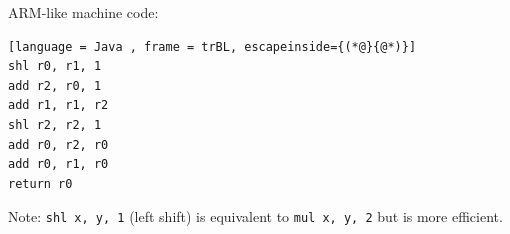 ARM-like machine code:
\begin{lstlisting}[language = Java , frame = trBL, escapeinside={(*@}{@*)}]
shl r0, r1, 1
add r2, r0, 1
add r1, r1, r2
shl r2, r2, 1 
add r0, r2, r0
add r0, r1, r0
return r0
\end{lstlisting}

Note: \texttt{shl x, y, 1} (left shift) is equivalent to \texttt{mul x, y, 2} but is more efficient.